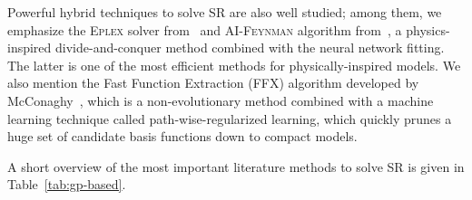 \documentclass{bmcart}
\begin{document}
Powerful hybrid techniques to solve SR are also well studied; among them, we emphasize the \textsc{Eplex} solver from~\cite{la2019probabilistic,la2016epsilon} and \textsc{AI-Feynman} algorithm from~\cite{udrescu2020ai}, a physics-inspired divide-and-conquer method combined with the neural network fitting. The latter is one of the most efficient methods for physically-inspired models. We also mention the Fast Function Extraction (\textsc{FFX}) algorithm developed by McConaghy~\cite{mcconaghy2011ffx}, which is a non-evolutionary method combined with a machine learning technique called path-wise-regularized learning, which quickly prunes a huge set of candidate basis functions down to compact models.

A short overview of the most important literature methods to solve SR is given in Table~\ref{tab:gp-based}.  
\end{document}
